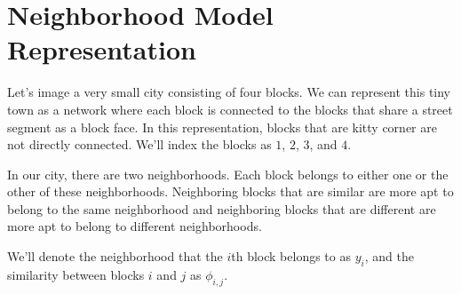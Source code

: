 \section*{Neighborhood Model Representation}
Let's image a very small city consisting of four blocks. We can
represent this tiny town as a network where each block is connected
to the blocks that share a street segment as a block face. In this
representation, blocks that are kitty corner are not directly
connected. We'll index the blocks as $1$, $2$, $3$, and $4$.

\begin{figure}
\centering
{}
\end{figure}

\begin{figure}
\centering


\end{figure}

In our city, there are two neighborhoods. Each block belongs to either
one or the other of these neighborhoods. Neighboring blocks that are
similar are more apt to belong to the same neighborhood and
neighboring blocks that are different are more apt to belong to
different neighborhoods.

We'll denote the neighborhood that the $i$th block belongs to as
$y_i$, and the similarity between blocks $i$ and $j$ as $\phi_{i,j}$.

\begin{figure}[!h]
\centering


\end{figure}

